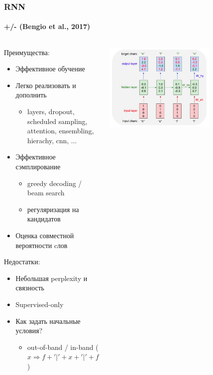 \documentclass[10pt]{beamer}
\begin{document}
\begin{frame}
\frametitle{RNN}
\framesubtitle{+/- (Bengio et al., 2017)}

\begin{columns}
    \begin{column}{0.5\textwidth}
        Преимущества:
        \begin{itemize}
            \item Эффективное обучение
            \item Легко реализовать и дополнить
            \begin{itemize}
                \item layers, dropout, scheduled sampling, attention, ensembling, hierachy, cnn, ...
            \end{itemize}
            \item Эффективное сэмплирование
            \begin{itemize}
                \item greedy decoding / beam search
                \item регуляризация на кандидатов
            \end{itemize}
            \item Оценка совместной вероятности cлов
        \end{itemize}
        Недостатки:
        \begin{itemize}
            \item Небольшая perplexity и связность
            \item Supervised-only
            \item Как задать начальные условия?
            \begin{itemize}
                \item out-of-band / in-band ($x \Rightarrow f + '|' + x + '|' + f$)
            \end{itemize} 
        \end{itemize}
    \end{column}
    \begin{column}{0.5\textwidth}
        \begin{center}
            \vskip-8mm
            \includegraphics[width=0.7\textwidth]{images/rnn.png}\\

\end{center}
\end{column}
\end{columns}
\end{frame}
\end{document}
